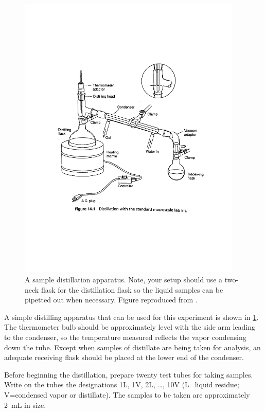 \begin{figure}
	\centering
	\includegraphics[width=0.95\textwidth]{figures/distillation_apparatus}
	\caption{A sample distillation apparatus. Note, your setup should use a two-neck flask for the distillation flask so the liquid samples can be pipetted out when necessary. Figure reproduced from \textcite{pavia1995organic}.}
	\label{fig:distillation_apparatus}
\end{figure}

A simple distilling apparatus that can be used for this experiment is shown in \cref{fig:distillation_apparatus}. 
The thermometer bulb should be approximately level with the side arm leading to the condenser, so the temperature measured reflects the vapor condensing down the tube. 
Except when samples of distillate are being taken for analysis, an adequate receiving flask should be placed at the lower end of the condenser. 

Before beginning the distillation, prepare twenty test tubes for taking samples. 
Write on the tubes the designations 1L, 1V, 2L, \dots, 10V (L=liquid residue; V=condensed vapor or distillate). 
The samples to be taken are approximately \qty{2}{\mL} in size. 

